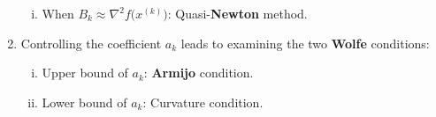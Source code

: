 \documentclass[12pt]{article}
\begin{document}
\begin{mdframed}
\begin{enumerate}
\begin{enumerate}[(i)]
			      \item When $B_k \approx \nabla^2 f \Big( x^{(k)} \Big)$: Quasi-\textbf{Newton} method.
		      \end{enumerate}
		      
		\item Controlling the coefficient $a_k$ leads to examining the two \textbf{Wolfe} conditions:
		      \begin{enumerate}[(i)]
			      \item Upper bound of $a_k$: \textbf{Armijo} condition.
			      \item Lower bound of $a_k$: Curvature condition.
		      \end{enumerate}
	\end{enumerate}
\end{mdframed}

\clearpage
\end{document}
